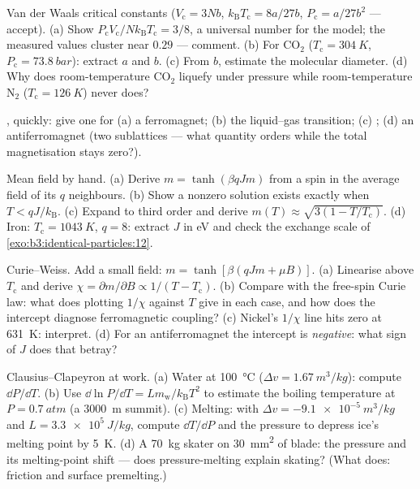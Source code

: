 \begin{exercise}[$\star$]\label{exo:b3:phase-transitions:3}
Van der Waals critical constants ($V_{\text{c}} = 3Nb$,
$k_{\text{B}}T_{\text{c}} = 8a/27b$, $P_{\text{c}} = a/27b^2$ ---
accept). (a) Show $P_{\text{c}}V_{\text{c}}/Nk_{\text{B}}T_{\text{
c}} = 3/8$, a universal number for the model; the measured values
cluster near $0.29$ --- comment. (b) For CO$_2$
($T_{\text{c}} = \qty{304}{K}$, $P_{\text{c}} = \qty{73.8}{bar}$):
extract $a$ and $b$. (c) From $b$, estimate the molecular
diameter. (d) Why does room-temperature CO$_2$ liquefy under
pressure while room-temperature N$_2$ ($T_{\text{c}} =
\qty{126}{K}$) never does?
\end{exercise}

\begin{exercise}[$\star$]\label{exo:b3:phase-transitions:4}
, quickly: give one for (a) a ferromagnet; (b)
the liquid--gas transition; (c) ; (d)
an antiferromagnet (two sublattices --- what quantity orders while
the total magnetisation stays zero?).
\end{exercise}

\begin{exercise}[$\star\star$]\label{exo:b3:phase-transitions:5}
Mean field by hand. (a) Derive $m = \tanh(\beta qJm)$ from a spin
in the average field of its $q$ neighbours. (b) Show a nonzero
solution exists exactly when $T < qJ/k_{\text{B}}$. (c) Expand to
third order and derive $m(T) \approx \sqrt{3(1 -
T/T_{\text{c}})}$. (d) Iron: $T_{\text{c}} = \qty{1043}{K}$, $q =
8$: extract $J$ in eV and check the exchange scale of
\cref{exo:b3:identical-particles:12}.
\end{exercise}

\begin{exercise}[$\star\star$]\label{exo:b3:phase-transitions:6}
Curie--Weiss. Add a small field: $m = \tanh[\beta(qJm + \mu B)]$.
(a) Linearise above $T_{\text{c}}$ and derive $\chi = \partial
m/\partial B \propto 1/(T - T_{\text{c}})$. (b) Compare with the
free-spin Curie law: what does plotting $1/\chi$ against $T$ give
in each case, and how does the intercept diagnose ferromagnetic
coupling? (c) Nickel's $1/\chi$ line hits zero at \qty{631}{K}:
interpret. (d) For an antiferromagnet the intercept is
\emph{negative}: what sign of $J$ does that betray?
\end{exercise}

\begin{exercise}[$\star\star$]\label{exo:b3:phase-transitions:7}
Clausius--Clapeyron at work. (a) Water at \qty{100}{\celsius}
($\Delta v = \qty{1.67}{m^3/kg}$): compute $\dd P/\dd T$. (b)
Use $\dd\ln P/\dd T = Lm_{\text{w}}/k_{\text{B}}T^2$ to estimate
the boiling temperature at $P = \qty{0.7}{atm}$ (a \qty{3000}{m}
summit). (c) Melting: with $\Delta v = \qty{-9.1e-5}{m^3/kg}$ and
$L = \qty{3.3e5}{J/kg}$, compute $\dd T/\dd P$ and the pressure
to depress ice's melting point by \qty{5}{K}. (d) A
\qty{70}{kg} skater on \qty{30}{mm^2} of blade: the pressure and
its melting-point shift --- does pressure-melting explain
skating? (What does: friction and surface premelting.)
\end{exercise}

